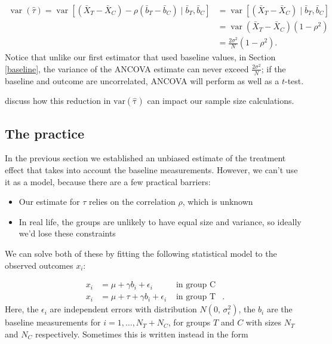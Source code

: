 \documentclass[
  openany]{book}
\providecommand{\tightlist}{%
  \setlength{\itemsep}{0pt}\setlength{\parskip}{0pt}}
\theoremstyle{definition}
\theoremstyle{definition}
\theoremstyle{definition}
\theoremstyle{definition}
\theoremstyle{remark}
\begin{document}
\[
\begin{aligned}
\operatorname{var}\left(\hat{\tau}\right) = \operatorname{var}\left[\left(\bar{X}_T - \bar{X}_C\right) - \rho\left(\bar{b}_T - \bar{b}_C\right)\mid{\bar{b}_T,\bar{b}_C}\right] &= \operatorname{var}\left[\left(\bar{X}_T - \bar{X}_C\right) \mid{\bar{b}_T,\bar{b}_C}\right]\\
& = \operatorname{var}\left(\bar{X}_T - \bar{X}_C\right)\left(1-\rho^2\right)\\
& = \frac{2\sigma^2}{N}\left(1-\rho^2\right).
\end{aligned}
\]
Notice that unlike our first estimator that used baseline values, in Section \ref{baseline}, the variance of the ANCOVA estimate can never exceed \(\frac{2\sigma^2}{N}\); if the baseline and outcome are uncorrelated, ANCOVA will perform as well as a \(t\)-test.

\citet{borm2007simple} discuss how this reduction in \(\operatorname{var\left(\hat{\tau}\right)}\) can impact our sample size calculations.

\hypertarget{the-practice}{%
\subsection{The practice}\label{the-practice}}

In the previous section we established an unbiased estimate of the treatment effect that takes into account the baseline measurements. However, we can't use it as a model, because there are a few practical barriers:

\begin{itemize}
\tightlist
\item
  Our estimate for \(\tau\) relies on the correlation \(\rho\), which is unknown
\item
  In real life, the groups are unlikely to have equal size and variance, so ideally we'd lose these constraints
\end{itemize}

We can solve both of these by fitting the following statistical model to the observed outcomes \(x_i\):

\[
\begin{aligned}
x_i & = \mu + \gamma b_i + \epsilon_i & \text{ in group C}\\
x_i & = \mu + \tau + \gamma b_i + \epsilon_i & \text{ in group T}&.
\end{aligned}
\]
Here, the \(\epsilon_i\) are independent errors with distribution \(N\left(0,\,\sigma^2_\epsilon\right)\), the \(b_i\) are the baseline measurements for \(i=1,\ldots,N_T+N_C\), for groups \(T\) and \(C\) with sizes \(N_T\) and \(N_C\) respectively. Sometimes this is written instead in the form
\end{document}
